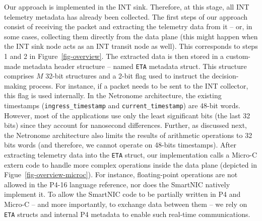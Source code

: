 Our approach is implemented in the INT sink. Therefore, at this stage, all INT telemetry metadata has already been collected. The first steps of our approach consist of receiving the packet and extracting the telemetry data from it -- or, in some cases, collecting them directly from the data plane (this might happen when the INT sink node acts as an INT transit node as well). This corresponds to steps 1 and 2 in Figure~\ref{fig-overview}. The extracted data is then stored in a custom-made metadata header structure -- named \texttt{ETA} metadata struct. This structure comprises $M$ 32-bit structures and a 2-bit flag used to instruct the decision-making process. For instance, if a packet needs to be sent to the INT collector, this flag is used internally. In the Netronome architecture, the existing timestamps (\texttt{ingress\_timestamp} and \texttt{current\_timestamp}) are 48-bit words. However, most of the applications use only the least significant bits (the last 32 bits) since they account for nanosecond differences. Further, as discussed next, the Netronome architecture also limits the results of arithmetic operations to 32 bits words (and therefore, we cannot operate on 48-bits timestamps). After extracting telemetry data into the \texttt{ETA} struct, our implementation calls a Micro-C extern code to handle more complex operations inside the data plane (depicted in Figue~\ref{fig-overview-microc}). For instance, floating-point operations are not allowed in the P4-16 language reference, nor does the SmartNIC natively implement it. To allow the SmartNIC code to be partially written in P4 and Micro-C -- and more importantly, to exchange data between them -- we rely on \texttt{ETA} structs and internal P4 metadata to enable such real-time communications.

